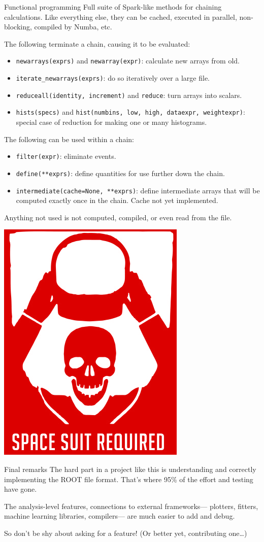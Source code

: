 \documentclass[aspectratio=169]{beamer}
\begin{document}
\begin{frame}{Functional programming}
\vspace{0.35 cm}
Full suite of Spark-like methods for chaining calculations. Like everything else, they can be cached, executed in parallel, non-blocking, compiled by Numba, etc.

\vspace{0.25 cm}
The following terminate a chain, causing it to be evaluated:
\begin{itemize}
\item {\tt\small newarrays(exprs)} and {\tt\small newarray(expr)}: calculate new arrays from old.
\item {\tt\small iterate\_newarrays(exprs)}: do so iteratively over a large file.
\item {\tt\small reduceall(identity, increment)} and {\tt\small reduce}: turn arrays into scalars.
\item {\tt\small hists(specs)} and {\tt\small hist(numbins, low, high, dataexpr, weightexpr)}: special case of reduction for making one or many histograms.
\end{itemize}

\vspace{0.25 cm}
The following can be used within a chain:
\begin{itemize}
\item {\tt\small filter(expr)}: eliminate events.
\item {\tt\small define(**exprs)}: define quantities for use further down the chain.
\item {\tt\small intermediate(cache=None, **exprs)}: define intermediate arrays that will be computed exactly once in the chain. Cache not yet implemented.
\end{itemize}

\vspace{0.25 cm}
Anything not used is not computed, compiled, or even read from the file.

\vspace{-6.9 cm}
\hfill \includegraphics[width=1.5 cm]{danger.png}\hspace{-0.9 cm}
\vspace{6.9 cm}
\end{frame}

\begin{frame}{Final remarks}
\vspace{0.5 cm}
\large
The hard part in a project like this is understanding and correctly implementing the ROOT file format. That's where 95\% of the effort and testing have gone.

\vspace{1 cm}
The analysis-level features, connections to external frameworks--- plotters, fitters, machine learning libraries, compilers--- are much easier to add and debug.

\vspace{1 cm}
So don't be shy about asking for a feature! (Or better yet, contributing one\ldots)
\end{frame}
\end{document}
